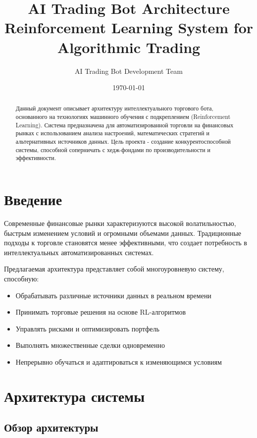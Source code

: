 \documentclass[12pt,a4paper]{article}
\title{\textbf{AI Trading Bot Architecture} \\ 
\large{Reinforcement Learning System for Algorithmic Trading}}
\author{AI Trading Bot Development Team}
\date{\today}
\begin{document}
\maketitle

\begin{abstract}
Данный документ описывает архитектуру интеллектуального торгового бота, основанного на технологиях машинного обучения с подкреплением (Reinforcement Learning). Система предназначена для автоматизированной торговли на финансовых рынках с использованием анализа настроений, математических стратегий и альтернативных источников данных. Цель проекта - создание конкурентоспособной системы, способной соперничать с хедж-фондами по производительности и эффективности.
\end{abstract}

\tableofcontents
\newpage

\section{Введение}

Современные финансовые рынки характеризуются высокой волатильностью, быстрым изменением условий и огромными объемами данных. Традиционные подходы к торговле становятся менее эффективными, что создает потребность в интеллектуальных автоматизированных системах.

Предлагаемая архитектура представляет собой многоуровневую систему, способную:
\begin{itemize}
    \item Обрабатывать различные источники данных в реальном времени
    \item Принимать торговые решения на основе RL-алгоритмов
    \item Управлять рисками и оптимизировать портфель
    \item Выполнять множественные сделки одновременно
    \item Непрерывно обучаться и адаптироваться к изменяющимся условиям
\end{itemize}

\section{Архитектура системы}

\subsection{Обзор архитектуры}
\end{document}
